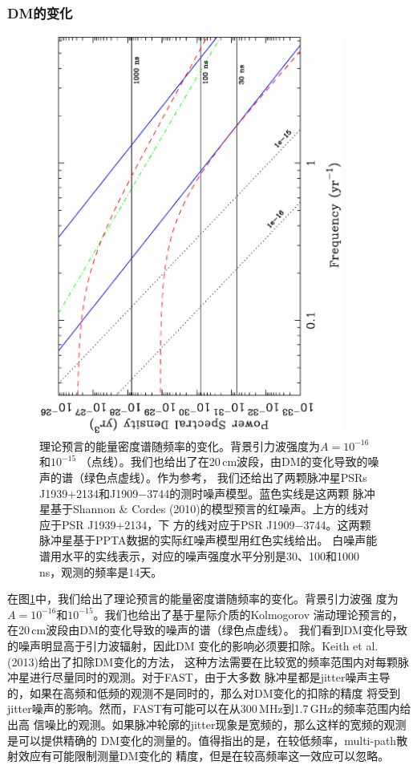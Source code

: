 \subsubsection{DM的变化}

\begin{figure}
\begin{center}
\includegraphics[angle=-90,width=10cm]{noiseLimits.ps}
\caption{理论预言的能量密度谱随频率的变化。背景引力波强度为$A = 10^{-16}$和$10^{-15}$
（点线）。我们也给出了在20\,cm波段，由DM的变化导致的噪声的谱（绿色点虚线）。作为参考，
我们还给出了两颗脉冲星PSRs J1939+2134和J1909$-$3744的测时噪声模型。蓝色实线是这两颗
脉冲星基于Shannon \& Cordes (2010)的模型预言的红噪声。上方的线对应于PSR J1939+2134，下
方的线对应于PSR J1909$-$3744。这两颗脉冲星基于PPTA数据的实际红噪声模型用红色实线给出。
白噪声能谱用水平的实线表示，对应的噪声强度水平分别是30、100和1000\,ns，观测的频率是14天。} 
\label{fg:noise}
\end{center}
\end{figure}

在图\ref{fg:noise}中，我们给出了理论预言的能量密度谱随频率的变化。背景引力波强
度为$A = 10^{-16}$和$10^{-15}$。我们也给出了基于星际介质的Kolmogorov
湍动理论预言的，在20\,cm波段由DM的变化导致的噪声的谱（绿色点虚线）。
我们看到DM变化导致的噪声明显高于引力波辐射，因此DM
变化的影响必须要扣除。Keith et al. (2013)\supercite{Keith13}给出了扣除DM变化的方法，
这种方法需要在比较宽的频率范围内对每颗脉冲星进行尽量同时的观测。对于FAST，由于大多数
脉冲星都是jitter噪声主导的，如果在高频和低频的观测不是同时的，那么对DM变化的扣除的精度
将受到jitter噪声的影响。然而，FAST有可能可以在从300\,MHz到1.7\,GHz的频率范围内给出高
信噪比的观测。如果脉冲轮廓的jitter现象是宽频的，那么这样的宽频的观测是可以提供精确的
DM变化的测量的。值得指出的是，在较低频率，multi-path散射效应有可能限制测量DM变化的
精度，但是在较高频率这一效应可以忽略。

